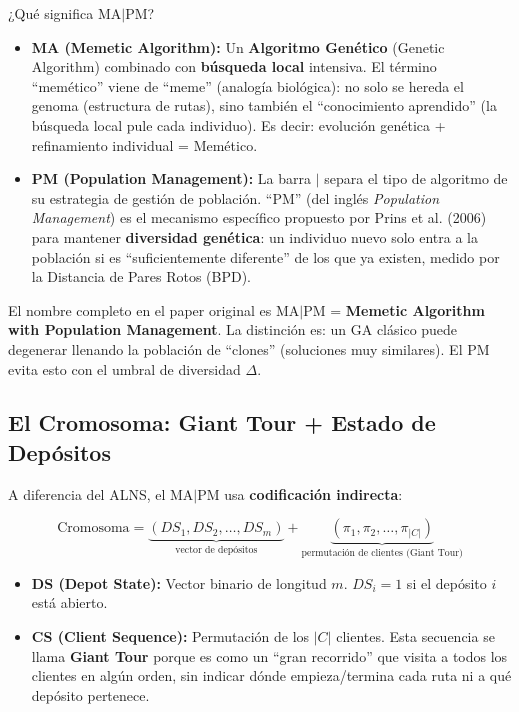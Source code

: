 \documentclass[12pt,a4paper]{article}
\begin{document}
\begin{pregunta}
¿Qué significa MA$|$PM?
\end{pregunta}

\begin{itemize}
\item \textbf{MA (Memetic Algorithm):} Un \textbf{Algoritmo Genético} (Genetic Algorithm) combinado con \textbf{búsqueda local} intensiva. El término ``memético'' viene de ``meme'' (analogía biológica): no solo se hereda el genoma (estructura de rutas), sino también el ``conocimiento aprendido'' (la búsqueda local pule cada individuo). Es decir: evolución genética + refinamiento individual = Memético.

\item \textbf{PM (Population Management):} La barra $|$ separa el tipo de algoritmo de su estrategia de gestión de población. ``PM'' (del inglés \textit{Population Management}) es el mecanismo específico propuesto por Prins et al. (2006) para mantener \textbf{diversidad genética}: un individuo nuevo solo entra a la población si es ``suficientemente diferente'' de los que ya existen, medido por la Distancia de Pares Rotos (BPD).
\end{itemize}

\begin{nota}
El nombre completo en el paper original es MA$|$PM = \textbf{Memetic Algorithm with Population Management}. La distinción es: un GA clásico puede degenerar llenando la población de ``clones'' (soluciones muy similares). El PM evita esto con el umbral de diversidad $\Delta$.
\end{nota}

\subsection{El Cromosoma: Giant Tour + Estado de Depósitos}

A diferencia del ALNS, el MA$|$PM usa \textbf{codificación indirecta}:

$$\text{Cromosoma} = \underbrace{(DS_1, DS_2, \ldots, DS_m)}_{\text{vector de depósitos}} + \underbrace{(\pi_1, \pi_2, \ldots, \pi_{|C|})}_{\text{permutación de clientes (Giant Tour)}}$$

\begin{itemize}
\item \textbf{DS (Depot State):} Vector binario de longitud $m$. $DS_i=1$ si el depósito $i$ está abierto.
\item \textbf{CS (Client Sequence):} Permutación de los $|C|$ clientes. Esta secuencia se llama \textbf{Giant Tour} porque es como un ``gran recorrido'' que visita a todos los clientes en algún orden, sin indicar dónde empieza/termina cada ruta ni a qué depósito pertenece.
\end{itemize}
\end{document}
